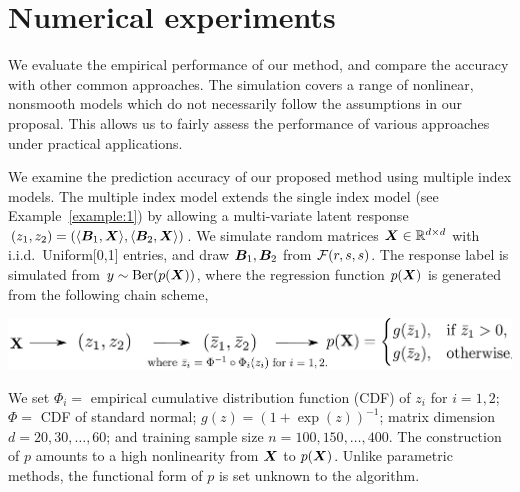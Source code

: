 \documentclass[11pt]{article}
\theoremstyle{definition}
\begin{document}
\vspace{-.3cm}
\section{Numerical experiments}\label{sec:data}
\vspace{-.5cm}
We evaluate the empirical performance of our method, and compare the accuracy with other common approaches. The simulation covers a range of nonlinear, nonsmooth models which do not necessarily follow the assumptions in our proposal. This allows us to fairly assess the performance of various approaches under practical applications. 

We examine the prediction accuracy of our proposed method using multiple index models. The multiple index model extends the single index model (see Example~\ref{example:1}) by allowing a multi-variate latent response $(z_1,z_2)=\left(\langle \bm B_1, \bm X \rangle,\langle \bm B_2, \bm X \rangle\right)$. We simulate random matrices $\bm X\in\mathbb{R}^{d\times d}$ with i.i.d.\ Uniform[0,1] entries, and draw $\bm B_1, \bm B_2$ from $\mathcal{F}(r,s,s)$. The response label is simulated from $y\sim \text{Ber}(p(\bm X))$, where the regression function $p(\bm X)$ is generated from the following chain scheme,

\vspace{.3cm}
\centerline{\includegraphics[width=.7\textwidth]{math.pdf}}
We set $\Phi_i = $ empirical cumulative distribution function (CDF) of $z_i$ for $i=1,2$; $\Phi = $ CDF of standard normal; $g(z)=(1+\exp(z))^{-1}$; matrix dimension $d=20,30,\ldots,60$; and training sample size $n=100, 150, \ldots, 400$. The construction of $p$ amounts to a high nonlinearity from $\bm X$ to $p(\bm X)$. Unlike parametric methods, the functional form of $p$ is set unknown to the algorithm. 
\end{document}

